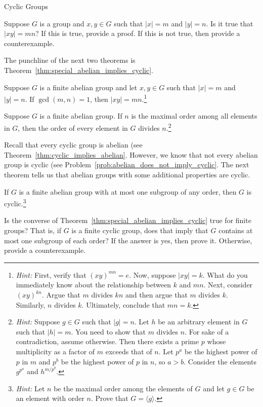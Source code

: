 \begin{section}{Cyclic Groups}
\begin{problem}
Suppose $G$ is a group and $x,y\in G$ such that $|x|=m$ and $|y|=n$. Is it true that $|xy|=mn$?  If this is true, provide a proof.  If this is not true, then provide a counterexample.
\end{problem}

The punchline of the next two theorems is Theorem~\ref{thm:special_abelian_implies_cyclic}.

\begin{theorem}
Suppose $G$ is a finite abelian group and let $x,y\in G$ such that $|x|=m$ and $|y|=n$. If $\gcd(m,n)=1$, then $|xy|=mn$.\footnote{\emph{Hint:} First, verify that $(xy)^{mn}=e$. Now, suppose $|xy|=k$. What do you immediately know about the relationship between $k$ and $mn$. Next, consider $(xy)^{kn}$. Argue that $m$ divides $kn$ and then argue that $m$ divides $k$. Similarly, $n$ divides $k$. Ultimately, conclude that $mn=k$.}
\end{theorem}

\begin{theorem}
Suppose $G$ is a finite abelian group. If $n$ is the maximal order among all elements in $G$, then the order of every element in $G$ divides $n$.\footnote{\emph{Hint:} Suppose $g\in G$ such that $|g|=n$. Let $h$ be an arbitrary element in $G$ such that $|h|=m$. You need to show that $m$ divides $n$. For sake of a contradiction, assume otherwise. Then there exists a prime $p$ whose multiplicity as a factor of $m$ exceeds that of $n$. Let $p^a$ be the highest power of $p$ in $m$ and $p^b$ be the highest power of $p$ in $n$, so $a>b$. Consider the elements $g^{p^a}$ and $h^{m/p^b}$.}
\end{theorem}

Recall that every cyclic group is abelian (see Theorem~\ref{thm:cyclic_implies_abelian}.  However, we know that not every abelian group is cyclic (see Problem~\ref{prob:abelian_does_not_imply_cyclic}.  The next theorem tells us that abelian groups with some additional properties are cyclic.

\begin{theorem}\label{thm:special_abelian_implies_cyclic}
If $G$ is a finite abelian group with at most one subgroup of any order, then $G$ is cyclic.\footnote{\emph{Hint:} Let $n$ be the maximal order among the elements of $G$ and let $g\in G$ be an element with order $n$. Prove that $G=\langle g\rangle$.}
\end{theorem}

\begin{problem}
Is the converse of Theorem~\ref{thm:special_abelian_implies_cyclic} true for finite groups?  That is, if $G$ is a finite cyclic group, does that imply that $G$ contains at most one subgroup of each order? If the answer is yes, then prove it.  Otherwise, provide a counterexample.
\end{problem}


\end{section}
